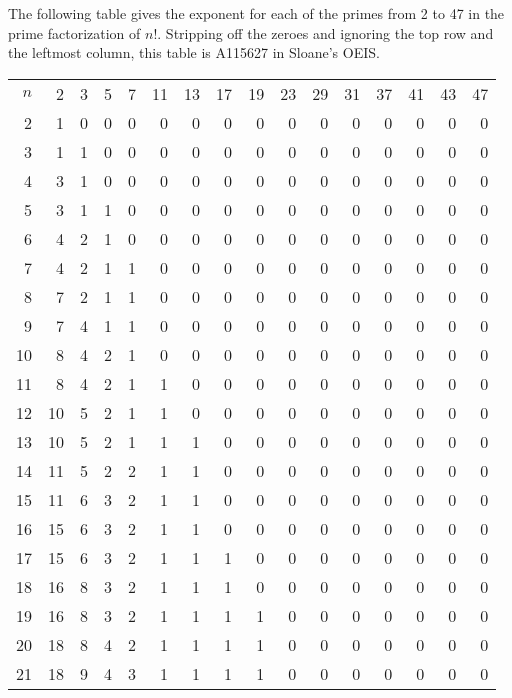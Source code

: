 \documentclass[12pt]{article}
\begin{document}
The following table gives the exponent for each of the primes from 2 to 47 in the prime factorization of $n!$. Stripping off the zeroes and ignoring the top row and the leftmost column, this table is A115627 in Sloane's OEIS.

\begin{tabular}{|r|r|r|r|r|r|r|r|r|r|r|r|r|r|r|r|}
$n$&  2 &  3 &  5 & 7 & 11& 13& 17& 19& 23& 29& 31& 37& 41& 43&47 \\
 2 &  1 &  0 &  0 & 0 & 0 & 0 & 0 & 0 & 0 & 0 & 0 & 0 & 0 & 0 & 0 \\
 3 &  1 &  1 &  0 & 0 & 0 & 0 & 0 & 0 & 0 & 0 & 0 & 0 & 0 & 0 & 0 \\
 4 &  3 &  1 &  0 & 0 & 0 & 0 & 0 & 0 & 0 & 0 & 0 & 0 & 0 & 0 & 0 \\
 5 &  3 &  1 &  1 & 0 & 0 & 0 & 0 & 0 & 0 & 0 & 0 & 0 & 0 & 0 & 0 \\
 6 &  4 &  2 &  1 & 0 & 0 & 0 & 0 & 0 & 0 & 0 & 0 & 0 & 0 & 0 & 0 \\
 7 &  4 &  2 &  1 & 1 & 0 & 0 & 0 & 0 & 0 & 0 & 0 & 0 & 0 & 0 & 0 \\
 8 &  7 &  2 &  1 & 1 & 0 & 0 & 0 & 0 & 0 & 0 & 0 & 0 & 0 & 0 & 0 \\
 9 &  7 &  4 &  1 & 1 & 0 & 0 & 0 & 0 & 0 & 0 & 0 & 0 & 0 & 0 & 0 \\
10 &  8 &  4 &  2 & 1 & 0 & 0 & 0 & 0 & 0 & 0 & 0 & 0 & 0 & 0 & 0 \\
11 &  8 &  4 &  2 & 1 & 1 & 0 & 0 & 0 & 0 & 0 & 0 & 0 & 0 & 0 & 0 \\
12 & 10 &  5 &  2 & 1 & 1 & 0 & 0 & 0 & 0 & 0 & 0 & 0 & 0 & 0 & 0 \\
13 & 10 &  5 &  2 & 1 & 1 & 1 & 0 & 0 & 0 & 0 & 0 & 0 & 0 & 0 & 0 \\
14 & 11 &  5 &  2 & 2 & 1 & 1 & 0 & 0 & 0 & 0 & 0 & 0 & 0 & 0 & 0 \\
15 & 11 &  6 &  3 & 2 & 1 & 1 & 0 & 0 & 0 & 0 & 0 & 0 & 0 & 0 & 0 \\
16 & 15 &  6 &  3 & 2 & 1 & 1 & 0 & 0 & 0 & 0 & 0 & 0 & 0 & 0 & 0 \\
17 & 15 &  6 &  3 & 2 & 1 & 1 & 1 & 0 & 0 & 0 & 0 & 0 & 0 & 0 & 0 \\
18 & 16 &  8 &  3 & 2 & 1 & 1 & 1 & 0 & 0 & 0 & 0 & 0 & 0 & 0 & 0 \\
19 & 16 &  8 &  3 & 2 & 1 & 1 & 1 & 1 & 0 & 0 & 0 & 0 & 0 & 0 & 0 \\
20 & 18 &  8 &  4 & 2 & 1 & 1 & 1 & 1 & 0 & 0 & 0 & 0 & 0 & 0 & 0 \\
21 & 18 &  9 &  4 & 3 & 1 & 1 & 1 & 1 & 0 & 0 & 0 & 0 & 0 & 0 & 0 \\

\end{tabular}
\end{document}
